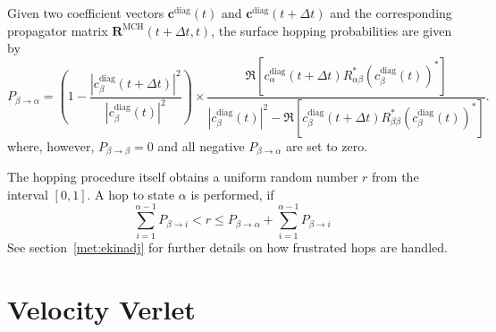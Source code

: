 \documentclass[a4paper,11pt,DIV=15,openany,twoside=false]{scrbook}
\renewcommand{\vec}[1]{\ensuremath{\mathbf{#1}}}
\begin{document}
Given two coefficient vectors $\vec{c}^{\text{diag}}(t)$ and $\vec{c}^{\text{diag}}(t+\Delta t)$ and the corresponding propagator matrix $\vec{R}^{\text{MCH}}(t+\Delta t,t)$, the surface hopping probabilities are given by
\begin{equation}
  P_{\beta\rightarrow\alpha}=
  \left(
    1-
    \frac{
      \left|
        c_\beta^{\text{diag}}(t+\Delta t)
      \right|^2
    }{
      \left|
        c_\beta^{\text{diag}}(t)
      \right|^2
    }\right)
    \times
    \frac{
      \Re\left[
        c^{\text{diag}}_\alpha(t+\Delta t)
        R^*_{\alpha\beta}
        \left(
          c^{\text{diag}}_\beta(t)
        \right)^*
      \right]
    }{
      \left|
        c^{\text{diag}}_\beta(t)
      \right|^2
      -\Re\left[
        c^{\text{diag}}_\beta(t+\Delta t)
        R^*_{\beta\beta}
        \left(
          c^{\text{diag}}_\beta(t)
        \right)^*
      \right]
    }.
\end{equation}
where, however, $P_{\beta\rightarrow\beta}=0$ and all negative $P_{\beta\rightarrow\alpha}$ are set to zero.

The hopping procedure itself obtains a uniform random number $r$ from the interval $[0,1]$. A hop to state $\alpha$ is performed, if
\begin{equation}
  \sum\limits_{i=1}^{\alpha-1} P_{\beta\rightarrow i} < r \le P_{\beta\rightarrow\alpha}+\sum\limits_{i=1}^{\alpha-1} P_{\beta\rightarrow i}
\end{equation}
See section~\ref{met:ekinadj} for further details on how frustrated hops are handled.


\section{Velocity Verlet}
\end{document}
